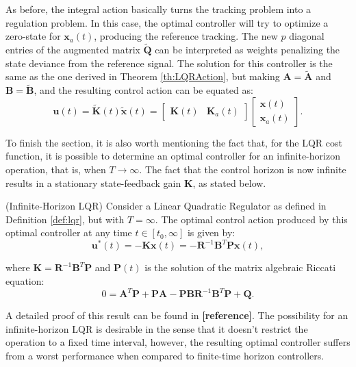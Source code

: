 \documentclass[a4paper,11pt]{book}
\numberwithin{figure}{chapter}
\numberwithin{equation}{chapter}
\numberwithin{table}{chapter}
\newtheorem{theorem}{Theorem}[chapter]
\theoremstyle{definition}
\newcounter{boxed-theorem}
\newenvironment{boxed-theorem}[1]
{\colorlet{shadecolor}{pastelBlue2!10} \begin{shaded} \begin{theorem}{#1}}
{\end{theorem} \end{shaded}}
\newcounter{boxed-definition}
\newcounter{boxed-example}
\begin{document}
As before, the integral action basically turns the tracking problem into a regulation problem. In this case, the optimal controller will try to optimize a zero-state for $\bm{x}_a(t)$, producing the reference tracking. The new $p$ diagonal entries of the augmented matrix $\tilde{\bm{Q}}$ can be interpreted as weights penalizing the state deviance from the reference signal. The solution for this controller is the same as the one derived in Theorem \ref{th:LQRAction}, but making $\bm{A} = \tilde{\bm{A}}$ and $\bm{B} = \tilde{\bm{B}}$, and the resulting control action can be equated as:
\begin{equation}
    \bm{u}(t) = \tilde{\bm{K}}(t)\tilde{\bm{x}}(t) = \begin{bmatrix} \bm{K}(t) & \bm{K}_a(t) \end{bmatrix} \begin{bmatrix} \bm{x}(t) \\ \bm{x}_a(t) \end{bmatrix}
.\end{equation}

To finish the section, it is also worth mentioning the fact that, for the LQR cost function, it is possible to determine an optimal controller for an infinite-horizon operation, that is, when $T \to \infty$. The fact that the control horizon is now infinite results in a stationary state-feedback gain $\bm{K}$, as stated below.

\begin{boxed-theorem}{(Infinite-Horizon LQR)} \label{th:infiniteLQR}
    Consider a Linear Quadratic Regulator as defined in Definition \ref{def:lqr}, but with $T = \infty$. The optimal control action produced by this optimal controller at any time $t \in [t_0, \infty]$ is given by:
    \begin{equation}
        \bm{u}^*(t) = - \bm{K} \bm{x}(t) = - \bm{R}^{-1} \bm{B}^T \bm{P} \bm{x}(t)
    ,\end{equation}
    
    \noindent where $\bm{K} = \bm{R}^{-1} \bm{B}^T \bm{P}$ and $\bm{P}(t)$ is the solution of the matrix algebraic Riccati equation:
    \begin{equation}
        0 = \bm{A}^T \bm{P} + \bm{P} \bm{A} - \bm{P} \bm{B} \bm{R}^{-1} \bm{B}^T \bm{P} + \bm{Q}
    .\end{equation}
\end{boxed-theorem}

A detailed proof of this result can be found in \textbf{[reference]}. The possibility for an infinite-horizon LQR is desirable in the sense that it doesn't restrict the operation to a fixed time interval, however, the resulting optimal controller suffers from a worst performance when compared to finite-time horizon controllers.
\end{document}
